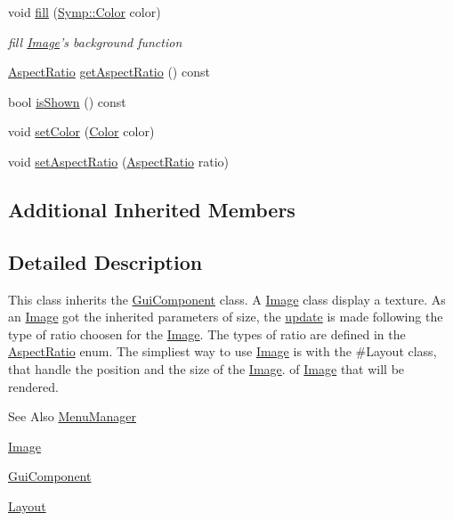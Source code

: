 \begin{DoxyCompactItemize}
void \hyperlink{class_symp_1_1_image_ac8795b3862086161eaff9047da933456}{fill} (\hyperlink{struct_symp_1_1_color}{Symp\-::\-Color} color)
\begin{DoxyCompactList}\small\item\em fill \hyperlink{class_symp_1_1_image}{Image}'s background function \end{DoxyCompactList}\item 
\hyperlink{namespace_symp_a2d0f7a8e888710a800fc73cf4d1ed38d}{Aspect\-Ratio} \hyperlink{class_symp_1_1_image_a93f4df550738cb50b7edd26dad17bdaf}{get\-Aspect\-Ratio} () const 
\item 
bool \hyperlink{class_symp_1_1_image_a78aa31b99ea41f0fd9cd013b1a34331b}{is\-Shown} () const 
\item 
void \hyperlink{class_symp_1_1_image_affacfb8d2e2dbd24f115b225eeeeed06}{set\-Color} (\hyperlink{struct_symp_1_1_color}{Color} color)
\item 
void \hyperlink{class_symp_1_1_image_aa0a5e8044ba9aa31e64b49dff9ff4218}{set\-Aspect\-Ratio} (\hyperlink{namespace_symp_a2d0f7a8e888710a800fc73cf4d1ed38d}{Aspect\-Ratio} ratio)
\end{DoxyCompactItemize}
\subsection*{Additional Inherited Members}


\subsection{Detailed Description}
This class inherits the \hyperlink{class_symp_1_1_gui_component_a22124675c2976983ac18374f81cc3fb3}{Gui\-Component} class. A \hyperlink{class_symp_1_1_image_afc591fe2f9770e6139509c4c62ffd3c1}{Image} class display a texture. As an \hyperlink{class_symp_1_1_image_afc591fe2f9770e6139509c4c62ffd3c1}{Image} got the inherited parameters of size, the \hyperlink{class_symp_1_1_image_a8de69cca37efc613094cfd1311ea1e13}{update} is made following the type of ratio choosen for the \hyperlink{class_symp_1_1_image_afc591fe2f9770e6139509c4c62ffd3c1}{Image}. The types of ratio are defined in the \hyperlink{namespace_symp_a2d0f7a8e888710a800fc73cf4d1ed38d}{Aspect\-Ratio} enum. The simpliest way to use \hyperlink{class_symp_1_1_image_afc591fe2f9770e6139509c4c62ffd3c1}{Image} is with the \#\-Layout class, that handle the position and the size of the \hyperlink{class_symp_1_1_image_afc591fe2f9770e6139509c4c62ffd3c1}{Image}. of \hyperlink{class_symp_1_1_image_afc591fe2f9770e6139509c4c62ffd3c1}{Image} that will be rendered. \begin{DoxySeeAlso}{See Also}
\hyperlink{class_symp_1_1_menu_manager}{Menu\-Manager} 

\hyperlink{class_symp_1_1_image}{Image} 

\hyperlink{class_symp_1_1_gui_component}{Gui\-Component} 

\hyperlink{class_symp_1_1_layout}{Layout} 
\end{DoxySeeAlso}


